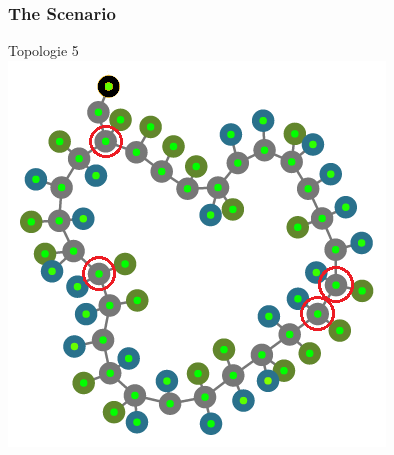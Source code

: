 \documentclass{beamer}
\begin{document}
\begin{frame}
	\frametitle{The Scenario}
	\centering
	Topologie 5 \\
	\includegraphics[height=0.8\textheight]{pics/topo_6.png}
\end{frame}
\end{document}
